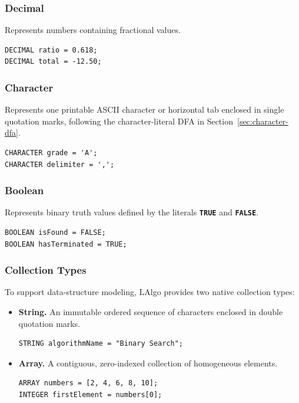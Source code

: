 \documentclass[11pt,a4paper]{article}
\newcommand{\kw}[1]{\texttt{\bfseries\color{pupmaroon}#1}}
\begin{document}
\subsubsection{Decimal}

Represents numbers containing fractional values.

\begin{lstlisting}
DECIMAL ratio = 0.618;
DECIMAL total = -12.50;
\end{lstlisting}

\subsubsection{Character}

Represents one printable ASCII character or horizontal tab enclosed in single quotation marks, following the character-literal DFA in Section~\ref{sec:character-dfa}.

\begin{lstlisting}
CHARACTER grade = 'A';
CHARACTER delimiter = ',';
\end{lstlisting}

\subsubsection{Boolean}

Represents binary truth values defined by the literals \kw{TRUE} and \kw{FALSE}.

\begin{lstlisting}
BOOLEAN isFound = FALSE;
BOOLEAN hasTerminated = TRUE;
\end{lstlisting}

\subsubsection{Collection Types}

To support data-structure modeling, LAlgo provides two native collection types:

\begin{itemize}
  \item \textbf{String.} An immutable ordered sequence of characters enclosed in double quotation marks.
\begin{lstlisting}
STRING algorithmName = "Binary Search";
\end{lstlisting}
  \item \textbf{Array.} A contiguous, zero-indexed collection of homogeneous elements.
\begin{lstlisting}
ARRAY numbers = [2, 4, 6, 8, 10];
INTEGER firstElement = numbers[0];
\end{lstlisting}
\end{itemize}
\end{document}
